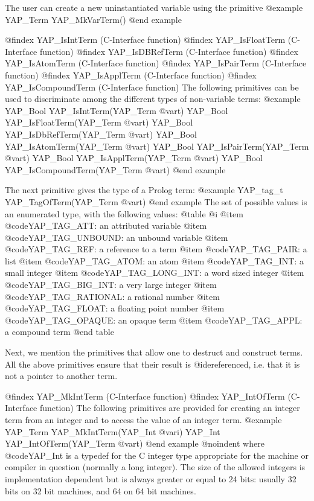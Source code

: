 {{{{{{{{{The user can create a new uninstantiated variable using the primitive
@example
      YAP_Term  YAP_MkVarTerm()
@end example


@findex YAP_IsIntTerm (C-Interface function)
@findex YAP_IsFloatTerm (C-Interface function)
@findex YAP_IsDBRefTerm (C-Interface function)
@findex YAP_IsAtomTerm (C-Interface function)
@findex YAP_IsPairTerm (C-Interface function)
@findex YAP_IsApplTerm (C-Interface function)
@findex YAP_IsCompoundTerm (C-Interface function)
The following primitives can be used to discriminate among the different types
of non-variable terms:
@example
      YAP_Bool YAP_IsIntTerm(YAP_Term @var{t})
      YAP_Bool YAP_IsFloatTerm(YAP_Term @var{t})
      YAP_Bool YAP_IsDbRefTerm(YAP_Term @var{t})
      YAP_Bool YAP_IsAtomTerm(YAP_Term @var{t})
      YAP_Bool YAP_IsPairTerm(YAP_Term @var{t})
      YAP_Bool YAP_IsApplTerm(YAP_Term @var{t})
      YAP_Bool YAP_IsCompoundTerm(YAP_Term @var{t})
@end example

The next primitive gives the type of a Prolog term:
@example
      YAP_tag_t YAP_TagOfTerm(YAP_Term @var{t})
@end example
The set of possible values is an enumerated type, with the following values:
@table @i
@item  @code{YAP_TAG_ATT}: an attributed variable
@item  @code{YAP_TAG_UNBOUND}: an unbound variable
@item  @code{YAP_TAG_REF}: a reference to a term
@item  @code{YAP_TAG_PAIR}: a list
@item  @code{YAP_TAG_ATOM}: an atom
@item  @code{YAP_TAG_INT}: a small integer
@item  @code{YAP_TAG_LONG_INT}: a word sized integer
@item  @code{YAP_TAG_BIG_INT}: a very large integer
@item  @code{YAP_TAG_RATIONAL}: a rational number
@item  @code{YAP_TAG_FLOAT}: a floating point number
@item  @code{YAP_TAG_OPAQUE}: an opaque term
@item  @code{YAP_TAG_APPL}: a compound term
@end table


Next, we mention the primitives that allow one to destruct and construct
terms. All the above primitives ensure that their result is
@i{dereferenced}, i.e. that it is not a pointer to another term.

@findex YAP_MkIntTerm (C-Interface function)
@findex YAP_IntOfTerm (C-Interface function)
The following primitives are provided for creating an integer term from an
integer and to access the value of an integer term.
@example
      YAP_Term YAP_MkIntTerm(YAP_Int  @var{i})
      YAP_Int  YAP_IntOfTerm(YAP_Term @var{t})
@end example
@noindent
where @code{YAP_Int} is a typedef for the C integer type appropriate for
the machine or compiler in question (normally a long integer). The size
of the allowed integers is implementation dependent but is always
greater or equal to 24 bits: usually 32 bits on 32 bit machines, and 64
on 64 bit machines.

}}}}}}}}}
